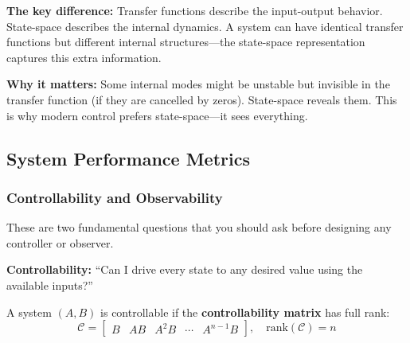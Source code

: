 \textbf{The key difference:} Transfer functions describe the input-output behavior. State-space describes the internal dynamics. A system can have identical transfer functions but different internal structures---the state-space representation captures this extra information.

\textbf{Why it matters:} Some internal modes might be unstable but invisible in the transfer function (if they are cancelled by zeros). State-space reveals them. This is why modern control prefers state-space---it sees everything.

\subsection{System Performance Metrics}

\subsubsection{Controllability and Observability}

These are two fundamental questions that you should ask before designing any controller or observer.

\textbf{Controllability:} ``Can I drive every state to any desired value using the available inputs?''

A system $(A, B)$ is controllable if the \textbf{controllability matrix} has full rank:
\begin{equation}
\mathcal{C} = \begin{bmatrix} B & AB & A^2B & \cdots & A^{n-1}B \end{bmatrix}, \quad \text{rank}(\mathcal{C}) = n
\end{equation}


